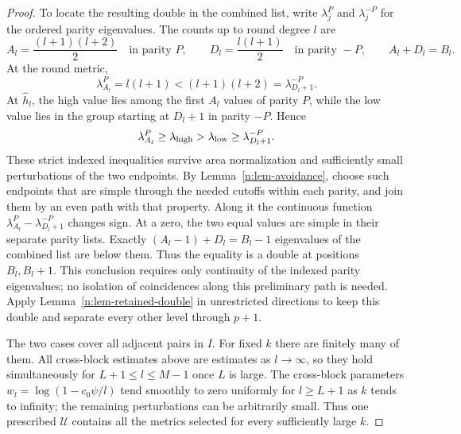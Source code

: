 \begin{proof}
To locate the resulting double in the combined list, write
\(\lambda_j^P\) and \(\lambda_j^{-P}\) for the ordered parity
eigenvalues.  The counts up to round degree \(l\) are
\begin{equation}\label{n:eq-parity-counts}
 A_l=\frac{(l+1)(l+2)}2\quad\text{in parity }P,\qquad
 D_l=\frac{l(l+1)}2\quad\text{in parity }-P,\qquad
 A_l+D_l=B_l.
\end{equation}
At the round metric,
\[
 \lambda_{A_l}^P=l(l+1)
 <(l+1)(l+2)=\lambda_{D_l+1}^{-P}.
\]
At \(\widehat h_l\), the high value lies among the first \(A_l\)
values of parity \(P\), while the low value lies in the group
starting at \(D_l+1\) in parity \(-P\).  Hence
\[
 \lambda_{A_l}^P\geq\lambda_{\rm high}
 >\lambda_{\rm low}\geq\lambda_{D_l+1}^{-P}.
\]
These strict indexed inequalities survive area normalization and
sufficiently small perturbations of the two endpoints.  By
Lemma~\ref{n:lem-avoidance}, choose such endpoints that are simple
through the needed cutoffs within each parity, and join them by an
even path with that property.  Along it the continuous function
\(\lambda_{A_l}^P-\lambda_{D_l+1}^{-P}\) changes sign.  At a zero,
the two equal values are simple in their separate parity lists.
Exactly
\((A_l-1)+D_l=B_l-1\) eigenvalues of the combined list are below
them.  Thus the equality is a double at positions \(B_l,B_l+1\).
This conclusion requires only continuity of the indexed parity
eigenvalues; no isolation of coincidences along this preliminary
path is needed.  Apply Lemma~\ref{n:lem-retained-double} in
unrestricted directions to keep this double and separate every
other level through \(p+1\).

The two cases cover all adjacent pairs in \(I\).  For fixed \(k\)
there are finitely many of them.  All cross-block estimates above are
estimates as \(l\to\infty\), so they hold simultaneously for
\(L+1\leq l\leq M-1\) once \(L\) is large.  The cross-block parameters
\(w_l=\log(1-c_0\psi/l)\) tend smoothly to zero uniformly for
\(l\geq L+1\) as \(k\) tends to infinity; the remaining
perturbations can be arbitrarily small.  Thus one prescribed
\(\mathcal U\) contains all the metrics selected for every
sufficiently large \(k\).
\end{proof}

